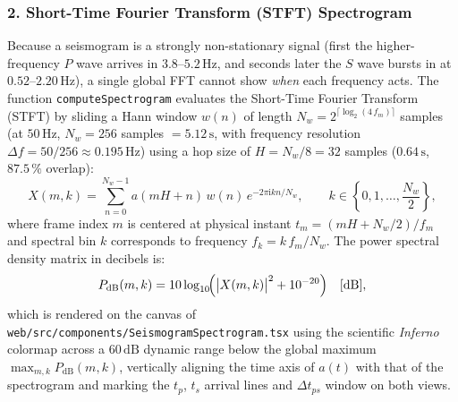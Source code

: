 \documentclass[11pt,a4paper]{article}
\newcommand{\src}[1]{\nolinkurl{#1}}
\newcommand{\unit}[1]{\mathrm{#1}}
\begin{document}
\subsubsection*{2. Short-Time Fourier Transform (STFT) Spectrogram}
Because a seismogram is a strongly non-stationary signal (first the higher-frequency $P$ wave arrives in
$3.8\text{--}5.2\,\unit{Hz}$, and seconds later the $S$ wave bursts in at $0.52\text{--}2.20\,\unit{Hz}$), a
single global FFT cannot show \emph{when} each frequency acts. The function \texttt{computeSpectrogram} evaluates
the Short-Time Fourier Transform (STFT) by sliding a Hann window $w(n)$ of length
$N_w = 2^{\lceil\log_2(4\,f_m)\rceil}$ samples (at $50\,\unit{Hz}$, $N_w = 256$ samples $= 5.12\,\unit{s}$, with
frequency resolution $\Delta f = 50/256 \approx 0.195\,\unit{Hz}$) using a hop size of
$H = N_w / 8 = 32$ samples ($0.64\,\unit{s}$, $87.5\,\text{\%}$ overlap):
\begin{equation}
  X(m,k) = \sum_{n=0}^{N_w - 1} a(mH + n)\,w(n)\,e^{-2\pi\mathrm{i}kn/N_w},
  \qquad
  k \in \left\{0,1,\ldots,\frac{N_w}{2}\right\},
  \label{eq:stft-definicion}
\end{equation}
where frame index $m$ is centered at physical instant $t_m = (mH + N_w/2)/f_m$ and spectral bin $k$ corresponds
to frequency $f_k = k\,f_m/N_w$. The power spectral density matrix in decibels is:
\begin{equation}
  P_{\mathrm{dB}}(m,k) = 10\log_{10}\!\Bigl(\bigl|X(m,k)\bigr|^2 + 10^{-20}\Bigr)\quad[\unit{dB}],
  \label{eq:stft-db}
\end{equation}
which is rendered on the canvas of \src{web/src/components/SeismogramSpectrogram.tsx} using the scientific
\emph{Inferno} colormap across a $60\,\unit{dB}$ dynamic range below the global maximum
$\max_{m,k} P_{\mathrm{dB}}(m,k)$, vertically aligning the time axis of $a(t)$ with that of the spectrogram and
marking the $t_p$, $t_s$ arrival lines and $\Delta t_{ps}$ window on both views.
\end{document}
